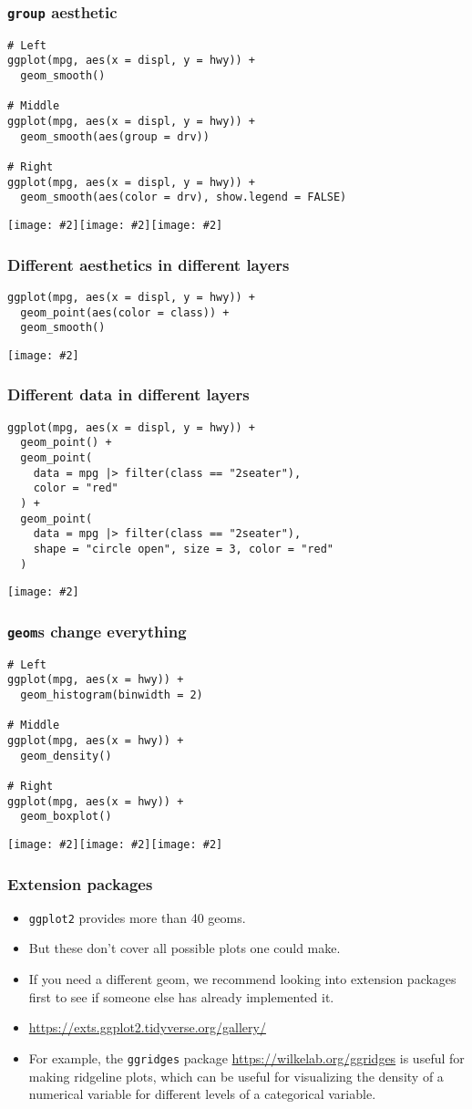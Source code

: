 \documentclass{beamer}
\newcommand{\bi}{\begin{itemize}}
\newcommand{\li}{\item}
\newcommand{\ei}{\end{itemize}}
\newcommand{\fig}[2]{\centerline{\texttt{[image: \#2]}}}
\newcommand{\figg}[2]{\texttt{[image: \#2]}}
\newcommand{\bfr}[1]{\begin{frame}[fragile]\frametitle{{ #1 }}}
\begin{document}
\bfr{{\tt group} aesthetic}\scriptsize
\begin{verbatim}
# Left
ggplot(mpg, aes(x = displ, y = hwy)) +
  geom_smooth()

# Middle
ggplot(mpg, aes(x = displ, y = hwy)) +
  geom_smooth(aes(group = drv))

# Right
ggplot(mpg, aes(x = displ, y = hwy)) +
  geom_smooth(aes(color = drv), show.legend = FALSE)
\end{verbatim}
\figg{0.33}{unnamed-chunk-13-1.png}\figg{0.33}{unnamed-chunk-13-2.png}\figg{0.33}{unnamed-chunk-13-3.png}
\end{frame}

\bfr{Different aesthetics in different layers}\scriptsize
\begin{verbatim}
ggplot(mpg, aes(x = displ, y = hwy)) + 
  geom_point(aes(color = class)) + 
  geom_smooth()
\end{verbatim}
\fig{.8}{unnamed-chunk-14-1.png}

\end{frame}

\bfr{Different data in different layers}\scriptsize
\begin{verbatim}
ggplot(mpg, aes(x = displ, y = hwy)) + 
  geom_point() + 
  geom_point(
    data = mpg |> filter(class == "2seater"), 
    color = "red"
  ) +
  geom_point(
    data = mpg |> filter(class == "2seater"), 
    shape = "circle open", size = 3, color = "red"
  )
\end{verbatim}
\fig{.65}{unnamed-chunk-15-1.png}

\end{frame}


\bfr{{\tt geom}s change everything}\scriptsize
\begin{verbatim}
# Left
ggplot(mpg, aes(x = hwy)) +
  geom_histogram(binwidth = 2)

# Middle
ggplot(mpg, aes(x = hwy)) +
  geom_density()

# Right
ggplot(mpg, aes(x = hwy)) +
  geom_boxplot()
\end{verbatim}
\figg{0.33}{unnamed-chunk-16-1.png}\figg{0.33}{unnamed-chunk-16-2.png}\figg{0.33}{unnamed-chunk-16-3.png}
\end{frame}

\bfr{Extension packages}
\bi
\li \verb|ggplot2| provides more than 40 geoms.
\li But these don’t cover all possible plots one could make.
\li If you need a different geom, we recommend looking into extension packages first to see if someone else has already implemented it.
\li \url{https://exts.ggplot2.tidyverse.org/gallery/}
\li For example, the \verb|ggridges| package \url{https://wilkelab.org/ggridges} is useful for making ridgeline plots, which can be useful for visualizing the density of a numerical variable for different levels of a categorical variable.
\ei
\end{frame}
\end{document}
